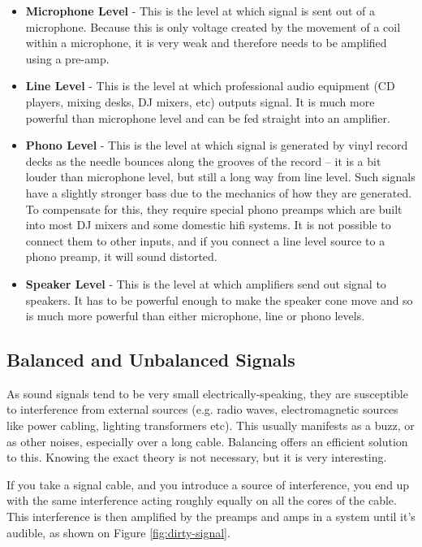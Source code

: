 \documentclass[14pt,twocolumn]{extarticle} %
\begin{document}
\begin{itemize}

\item \textbf{Microphone Level} - This is the level at which signal is sent out of a microphone. Because this is only voltage created by the movement of a coil within a microphone, it is very weak and therefore needs to be amplified using a pre-amp.

\item \textbf{Line Level} - This is the level at which professional audio equipment (CD players, mixing desks, DJ mixers, etc) outputs signal. It is much more powerful than microphone level and can be fed straight into an amplifier.

\item \textbf{Phono Level} - This is the level at which signal is generated by vinyl record decks as the needle bounces along the grooves of the record – it is a bit louder than microphone level, but still a long way from line level. Such signals have a
slightly stronger bass due to the mechanics of how they are generated. To compensate for this, they require special phono preamps which are built into most DJ mixers and some domestic hifi systems. It is not possible to connect them to other inputs, and if you connect a line level source to a phono preamp, it will sound distorted.

\item \textbf{Speaker Level} - This is the level at which amplifiers send out signal to speakers. It has to be powerful enough to make the speaker cone move and so is much more powerful than either microphone, line or phono levels.

\end{itemize}


\subsection{Balanced and Unbalanced Signals}
\label{balanced-unbalanced}
As sound signals tend to be very small electrically-speaking, they are susceptible to interference from external sources (e.g. radio waves, electromagnetic sources like power cabling, lighting transformers etc). This usually manifests as a buzz, or as other noises, especially over a long cable. Balancing offers an efficient solution to this. Knowing the exact theory is not necessary, but it is very interesting. 

If you take a signal cable, and you introduce a source of interference, you end up with the same interference acting roughly equally on all the cores of the cable. This interference is then amplified by the preamps and amps in a system until it’s audible, as shown on Figure \ref{fig:dirty-signal}.
\end{document}
